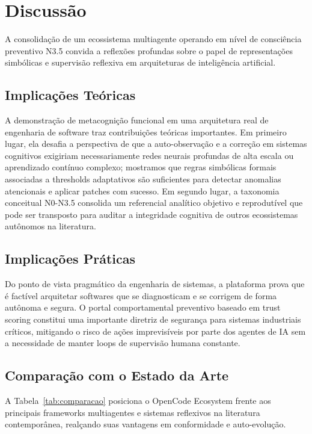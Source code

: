 \documentclass[12pt,a4paper,oneside]{abntex2}
\begin{document}
\section{Discussão}

A consolidação de um ecossistema multiagente operando em nível de consciência preventivo N3.5 convida a reflexões profundas sobre o papel de representações simbólicas e supervisão reflexiva em arquiteturas de inteligência artificial.

\subsection{Implicações Teóricas}

A demonstração de metacognição funcional em uma arquitetura real de engenharia de software traz contribuições teóricas importantes. Em primeiro lugar, ela desafia a perspectiva de que a auto-observação e a correção em sistemas cognitivos exigiriam necessariamente redes neurais profundas de alta escala ou aprendizado contínuo complexo; mostramos que regras simbólicas formais associadas a thresholds adaptativos são suficientes para detectar anomalias atencionais e aplicar patches com sucesso. Em segundo lugar, a taxonomia conceitual N0-N3.5 consolida um referencial analítico objetivo e reprodutível que pode ser transposto para auditar a integridade cognitiva de outros ecossistemas autônomos na literatura.

\subsection{Implicações Práticas}

Do ponto de vista pragmático da engenharia de sistemas, a plataforma prova que é factível arquitetar softwares que se diagnosticam e se corrigem de forma autônoma e segura. O portal comportamental preventivo baseado em trust scoring constitui uma importante diretriz de segurança para sistemas industriais críticos, mitigando o risco de ações imprevisíveis por parte dos agentes de IA sem a necessidade de manter loops de supervisão humana constante.

\subsection{Comparação com o Estado da Arte}

A Tabela~\ref{tab:comparacao} posiciona o OpenCode Ecosystem frente aos principais frameworks multiagentes e sistemas reflexivos na literatura contemporânea, realçando suas vantagens em conformidade e auto-evolução.
\end{document}
